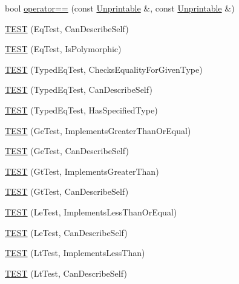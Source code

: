\begin{DoxyCompactItemize}
bool \hyperlink{namespacetesting_1_1gmock__matchers__test_a4b9f261a3b98ba0e0bca21b69d593241}{operator==} (const \hyperlink{classtesting_1_1gmock__matchers__test_1_1_unprintable}{Unprintable} \&, const \hyperlink{classtesting_1_1gmock__matchers__test_1_1_unprintable}{Unprintable} \&)
\item 
\hyperlink{namespacetesting_1_1gmock__matchers__test_a1c86e845cb44f34eeac4863041c871c6}{T\+E\+ST} (Eq\+Test, Can\+Describe\+Self)
\item 
\hyperlink{namespacetesting_1_1gmock__matchers__test_ac3ea755ba2a8bb480cee70aa37ccafc2}{T\+E\+ST} (Eq\+Test, Is\+Polymorphic)
\item 
\hyperlink{namespacetesting_1_1gmock__matchers__test_a3e8d6cc259c1410a85572bc773bb21b9}{T\+E\+ST} (Typed\+Eq\+Test, Checks\+Equality\+For\+Given\+Type)
\item 
\hyperlink{namespacetesting_1_1gmock__matchers__test_a9baf261536023ac58ed65cdafcaf1602}{T\+E\+ST} (Typed\+Eq\+Test, Can\+Describe\+Self)
\item 
\hyperlink{namespacetesting_1_1gmock__matchers__test_ae0255a5de2ef537512379c3f8ff9e34f}{T\+E\+ST} (Typed\+Eq\+Test, Has\+Specified\+Type)
\item 
\hyperlink{namespacetesting_1_1gmock__matchers__test_a7d73fdbbee36ccf241ec6e328175655b}{T\+E\+ST} (Ge\+Test, Implements\+Greater\+Than\+Or\+Equal)
\item 
\hyperlink{namespacetesting_1_1gmock__matchers__test_a2718c8d5456b62ab7b060b2723939a72}{T\+E\+ST} (Ge\+Test, Can\+Describe\+Self)
\item 
\hyperlink{namespacetesting_1_1gmock__matchers__test_a87a9ac189a12e0b85964f03b3b9998b1}{T\+E\+ST} (Gt\+Test, Implements\+Greater\+Than)
\item 
\hyperlink{namespacetesting_1_1gmock__matchers__test_a2981bbdbf9cbd8864a6dde4ff4b06050}{T\+E\+ST} (Gt\+Test, Can\+Describe\+Self)
\item 
\hyperlink{namespacetesting_1_1gmock__matchers__test_af0cd1cfc3ff1272bfe06f31c5eb3ab8b}{T\+E\+ST} (Le\+Test, Implements\+Less\+Than\+Or\+Equal)
\item 
\hyperlink{namespacetesting_1_1gmock__matchers__test_a463bc4f6cdca489c05ad691e1254e2f3}{T\+E\+ST} (Le\+Test, Can\+Describe\+Self)
\item 
\hyperlink{namespacetesting_1_1gmock__matchers__test_a9f332401730e637d5c3923924dc339e3}{T\+E\+ST} (Lt\+Test, Implements\+Less\+Than)
\item 
\hyperlink{namespacetesting_1_1gmock__matchers__test_ae29bb32c74970fc22e7ac5d86e7e6c26}{T\+E\+ST} (Lt\+Test, Can\+Describe\+Self)

\end{DoxyCompactItemize}
